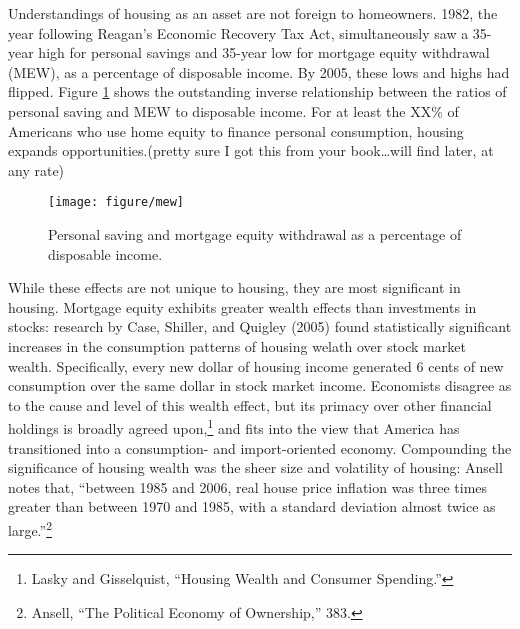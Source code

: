 \documentclass[
]{article}
\begin{document}
Understandings of housing as an asset are not foreign to homeowners.
1982, the year following Reagan's Economic Recovery Tax Act, simultaneously saw a 35-year high for personal savings and 35-year low for mortgage equity withdrawal (MEW), as a percentage of disposable income.
By 2005, these lows and highs had flipped.
Figure \ref{fig:mew} shows the outstanding inverse relationship between the ratios of personal saving and MEW to disposable income.
For at least the XX\% of Americans who use home equity to finance personal consumption, housing expands opportunities.(pretty sure I got this from your book\ldots will find later, at any rate)

\begin{figure}

{\centering \texttt{[image: figure/mew]}

}

\caption{Personal saving and mortgage equity withdrawal as a percentage of disposable income.}\label{fig:mew}
\end{figure}

While these effects are not unique to housing, they are most significant in housing.
Mortgage equity exhibits greater wealth effects than investments in stocks: research by Case, Shiller, and Quigley (2005) found statistically significant increases in the consumption patterns of housing welath over stock market wealth.
Specifically, every new dollar of housing income generated 6 cents of new consumption over the same dollar in stock market income.
Economists disagree as to the cause and level of this wealth effect, but its primacy over other financial holdings is broadly agreed upon,\footnote{Lasky and Gisselquist, ``Housing Wealth and Consumer Spending.''} and fits into the view that America has transitioned into a consumption- and import-oriented economy.
Compounding the significance of housing wealth was the sheer size and volatility of housing: Ansell notes that, ``between 1985 and 2006, real house price inflation was three times greater than between 1970 and 1985, with a standard deviation almost twice as large.''\footnote{Ansell, ``The Political Economy of Ownership,'' 383.}
\end{document}
